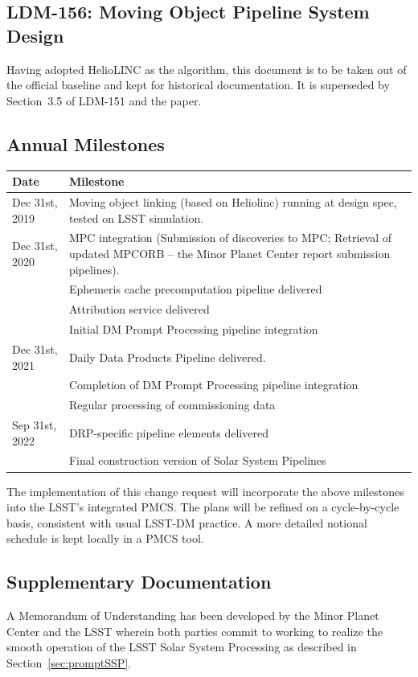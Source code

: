 \documentclass[DM,authoryear,toc,lsstdraft]{lsstdoc}
\begin{document}
\subsection{LDM-156: Moving Object Pipeline System Design}

Having adopted HelioLINC as the algorithm, this document is to be taken out of the official baseline and kept for historical documentation. It is superseded by Section~3.5 of LDM-151 and the \cite{2018AJ....156..135H} paper.

\subsection{Annual Milestones}

	\begin{tabular}{ p{1.5in}p{4.5in} } 
		\hline
		Date & Milestone \\
		\hline
		\hline
		Dec 31st, 2019 & Moving object linking (based on Heliolinc) running at design spec, tested on LSST simulation. \\ 
		Dec 31st, 2020 & MPC integration (Submission of discoveries to MPC; Retrieval of updated MPCORB -- the Minor Planet Center report submission pipelines). \\
		              & Ephemeris cache precomputation pipeline delivered \\
		              & Attribution service delivered \\
		              & Initial DM Prompt Processing pipeline integration \\
		Dec 31st, 2021 & Daily Data Products Pipeline delivered. \\
		              & Completion of DM Prompt Processing pipeline integration \\
		              & Regular processing of commissioning data \\
		Sep 31st, 2022 & DRP-specific pipeline elements delivered \\
		              & Final construction version of Solar System Pipelines \\
		\hline
	\end{tabular}

The implementation of this change request will incorporate the above milestones into the LSST's integrated PMCS. The plans will be refined on a cycle-by-cycle basis, consistent with usual LSST-DM practice. A more detailed notional schedule is kept locally in a PMCS tool.

\subsection{Supplementary Documentation}

A Memorandum of Understanding has been developed by the Minor Planet Center and the LSST wherein both parties commit to working to realize the smooth operation of the LSST Solar System Processing as described in Section~\ref{sec:promptSSP}.


\end{document}
